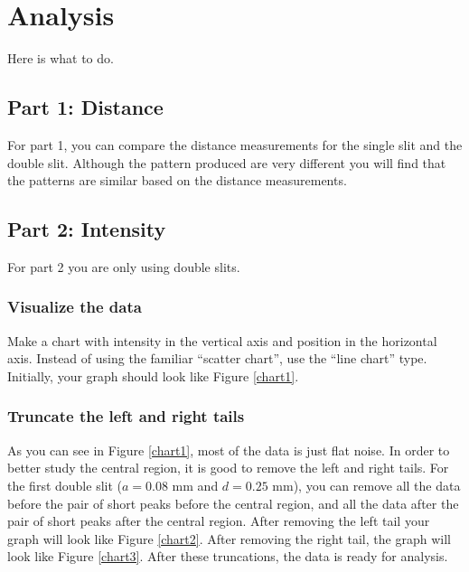 \section{Analysis}
Here is what to do.
\subsection{Part 1: Distance}
For part 1, you can compare the distance measurements for the single slit and the double slit. Although the pattern produced are very different you will find that the patterns are similar based on the distance measurements.
\subsection{Part 2: Intensity}
For part 2 you are only using double slits.
\subsubsection{Visualize the data}
Make a chart with intensity in the vertical axis and position in the horizontal axis. Instead of using the familiar ``scatter chart'', use the ``line chart'' type. Initially, your graph should look like Figure \ref{chart1}.
\subsubsection{Truncate the left and right tails}
As you can see in Figure \ref{chart1}, most of the data is just flat noise. In order to better study the central region, it is good to remove the left and right tails. For the first double slit ($a = 0.08$ mm and $d = 0.25$ mm), you can remove all the data before the pair of short peaks before the central region, and all the data after the pair of short peaks after the central region. After removing the left tail your graph will look like Figure \ref{chart2}. After removing the right tail, the graph will look like Figure \ref{chart3}. After these truncations, the data is ready for analysis.

